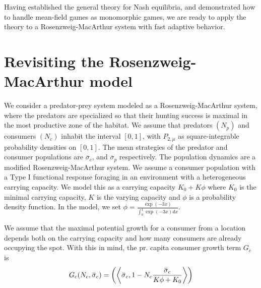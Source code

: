 Having established the general theory for Nash equilibria, and demonstrated how to handle mean-field games as monomorphic games, we are ready to apply the theory to a Rosenzweig-MacArthur system with fast adaptive behavior.
\section{Revisiting the Rosenzweig-MacArthur model}
\label{sec:model_rm}
We consider a predator-prey system modeled as a Rosenzweig-MacArthur system, where the predators are specialized so that their hunting success is maximal in the most productive zone of the habitat.
We assume that predators $(N_p)$ and consumers $(N_c)$ inhabit the interval $[0,1]$, with $P_{2,\mu}$ as square-integrable probability densities on $[0,1]$. The mean strategies of the predator and consumer populations are $\overbar{\sigma}_c$, and $\overbar{\sigma}_p$ respectively.
The population dynamics are a modified Rosenzweig-MacArthur system. We assume a consumer population with a Type I functional response foraging in an environment with a heterogeneous carrying capacity. We model this as a carrying capacity $K_0 + K \phi$ where $K_0$ is the minimal carrying capacity, $K$ is the varying capacity and $\phi$ is a probability density function. In the model, we set  $\phi = \frac{\exp(-3 x)}{\int_0^1 \exp(-3 x) dx}$.

We assume that the maximal potential growth for a consumer from a location depends both on the carrying capacity and how many consumers are already occupying the spot. With this in mind, the pr. capita consumer growth term $G_c$ is
\begin{equation}
  G_c(N_c, \overbar{\sigma}_c) = \pa{\ip{\overbar{\sigma}_c}{1-N_c \frac{\overbar{\sigma}_c}{K\phi + K_0}}}
\end{equation}

